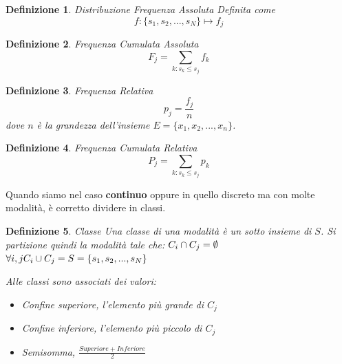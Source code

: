\documentclass{article}
\newtheorem{definition}{Definizione}[section]
\begin{document}
    \begin{definition}{Distribuzione Frequenza Assoluta} 
    Definita come $$f\colon \{s_1,s_2,...,s_N\}\mapsto f_j$$
    \end{definition}
    
   \begin{definition}{Frequenza Cumulata Assoluta}
    $$ F_j= \sum_{k:s_k \leq s_j} f_k$$
    \end{definition}
    
    \begin{definition}{Frequenza Relativa}
        $$p_j=\frac{f_j}{n}$$ dove $n$ è la grandezza dell'insieme $E=\{x_1,x_2,...,x_n\}$.
    \end{definition}
    
    \begin{definition}{Frequenza Cumulata Relativa}
        $$ P_j= \sum_{k:s_k \leq s_j} p_k$$
    \end{definition}
    
    Quando siamo nel caso \textbf{continuo} oppure in quello discreto ma con molte modalità, è corretto dividere in classi. 
    \begin{definition}{Classe}
        Una classe di una modalità è un sotto insieme di $S$.
        Si partizione quindi la modalità tale che: 
        $\\C_i\cap C_j = \emptyset$  $\forall i,j \\
        C_i\cup C_j =S=\{s_1,s_2,...,s_N\}\\$
        
        
        Alle classi sono associati dei valori: 
        \begin{itemize}
            \item Confine superiore, l'elemento più grande di $C_j$
            \item Confine inferiore, l'elemento più piccolo di $C_j$
            \item Semisomma, $\frac{Superiore + Inferiore}{2}$
        \end{itemize}
    \end{definition}
    \newpage
\end{document}
